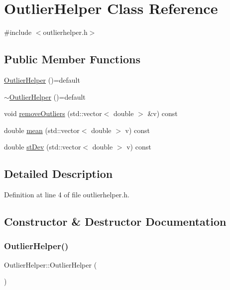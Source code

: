 \hypertarget{class_outlier_helper}{}\section{Outlier\+Helper Class Reference}
\label{class_outlier_helper}


{\ttfamily \#include $<$outlierhelper.\+h$>$}

\subsection*{Public Member Functions}
\begin{DoxyCompactItemize}
\item 
\mbox{\hyperlink{class_outlier_helper_ae96c240438ee24239785bb7584cbbb38}{Outlier\+Helper}} ()=default
\item 
\mbox{\hyperlink{class_outlier_helper_abcdc45be935821173222cb6c960dfdeb}{$\sim$\+Outlier\+Helper}} ()=default
\item 
void \mbox{\hyperlink{class_outlier_helper_ac8d720064a0c39c9178417c5077cfa43}{remove\+Outliers}} (std\+::vector$<$ double $>$ \&v) const
\item 
double \mbox{\hyperlink{class_outlier_helper_a15110f2e9b10b243ba072ca08accfc32}{mean}} (std\+::vector$<$ double $>$ v) const
\item 
double \mbox{\hyperlink{class_outlier_helper_a329143b98163a03aa80a2950b3b1d8cf}{st\+Dev}} (std\+::vector$<$ double $>$ v) const
\end{DoxyCompactItemize}


\subsection{Detailed Description}


Definition at line 4 of file outlierhelper.\+h.



\subsection{Constructor \& Destructor Documentation}
\mbox{\label{class_outlier_helper_ae96c240438ee24239785bb7584cbbb38}} 
\subsubsection{\texorpdfstring{Outlier\+Helper()}{OutlierHelper()}}
{\footnotesize\ttfamily Outlier\+Helper\+::\+Outlier\+Helper (\begin{DoxyParamCaption}{ }\end{DoxyParamCaption})\hspace{0.3cm}{\ttfamily [default]}}

